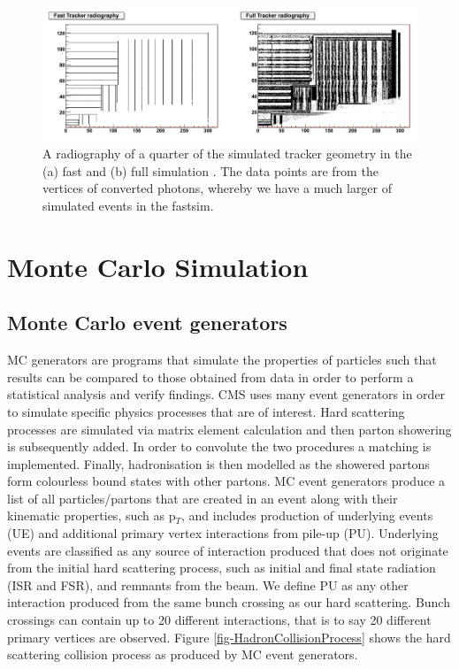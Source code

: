 \begin{figure} 
\begin{center}
\includegraphics[width=\textwidth]{Figures/FullSim.png}
\end{center}
\caption{A radiography of a quarter of the simulated tracker geometry in the (a) fast and (b) full simulation \cite{1742-6596-513-2-022012}. The data points are from the vertices of converted photons, whereby we have a much larger of simulated events in the fastsim.}
\label{fig-FullSim}
\end{figure}

\section{Monte Carlo Simulation}

\subsection{Monte Carlo event generators} \label{subsec-MCEventGenerators}

MC generators are programs that simulate the properties of particles such that results can be compared to those obtained from data in order to perform a statistical analysis and verify findings. CMS uses many event generators in order to simulate specific physics processes that are of interest. Hard scattering processes are simulated via matrix element calculation and then parton showering is subsequently added. In order to convolute the two procedures a matching is implemented. Finally, hadronisation is then modelled as the showered partons form colourless bound states with other partons. MC event generators produce a list of all particles/partons that are created in an event along with their kinematic properties, such as p$_T$, and includes production of underlying events (UE) and additional primary vertex interactions from pile-up (PU). Underlying events are classified as any source of interaction produced that does not originate from the initial hard scattering process, such as initial and final state radiation (ISR and FSR), and remnants from the beam. We define PU as any other interaction produced from the same bunch crossing as our hard scattering. Bunch crossings can contain up to 20 different interactions, that is to say 20 different primary vertices are observed. Figure \ref{fig-HadronCollisionProcess} shows the hard scattering collision process as produced by MC event generators. 

